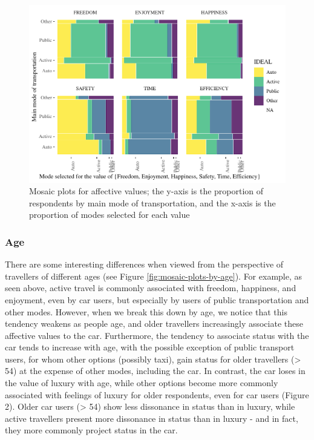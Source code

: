 \documentclass[]{elsarticle} %
\makeatletter
\def\maxwidth{\ifdim\Gin@nat@width>\linewidth\linewidth
\else\Gin@nat@width\fi}
\let\Oldincludegraphics\includegraphics
\renewcommand{\includegraphics}[1]{\Oldincludegraphics[width=\maxwidth]{#1}}
\makeatother
\begin{document}
\begin{figure}
\centering
\includegraphics{Dissonance_Santiago_v1_files/figure-latex/figure-mosaic-plots-by-attribute-1.pdf}
\caption{\label{fig:mosaic-plots-by-attribute}Mosaic plots for affective
values; the y-axis is the proportion of respondents by main mode of
transportation, and the x-axis is the proportion of modes selected for
each value}
\end{figure}

\hypertarget{age-1}{%
\subsubsection{Age}\label{age-1}}

There are some interesting differences when viewed from the perspective
of travellers of different ages (see Figure
\ref{fig:mosaic-plots-by-age}). For example, as seen above, active
travel is commonly associated with freedom, happiness, and enjoyment,
even by car users, but especially by users of public transportation and
other modes. However, when we break this down by age, we notice that
this tendency weakens as people age, and older travellers increasingly
associate these affective values to the car. Furthermore, the tendency
to associate status with the car tends to increase with age, with the
possible exception of public transport users, for whom other options
(possibly taxi), gain status for older travellers (\textgreater{} 54) at
the expense of other modes, including the car. In contrast, the car
loses in the value of luxury with age, while other options become more
commonly associated with feelings of luxury for older respondents, even
for car users (Figure 2). Older car users (\textgreater{} 54) show less
dissonance in status than in luxury, while active travellers present
more dissonance in status than in luxury - and in fact, they more
commonly project status in the car.
\end{document}
